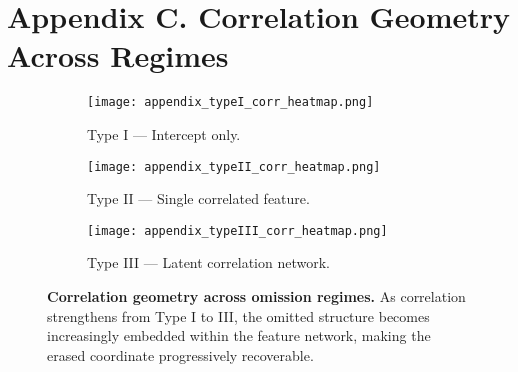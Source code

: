 \documentclass[11pt]{article}
\begin{document}
\clearpage

\section{Appendix C. Correlation Geometry Across Regimes}

\begin{figure}[H]
  \centering
  \begin{subfigure}[t]{0.32\textwidth}
    \texttt{[image: appendix\_typeI\_corr\_heatmap.png]}
    \caption{Type I — Intercept only.}
  \end{subfigure}
  \hfill
  \begin{subfigure}[t]{0.32\textwidth}
    \texttt{[image: appendix\_typeII\_corr\_heatmap.png]}
    \caption{Type II — Single correlated feature.}
  \end{subfigure}
  \hfill
  \begin{subfigure}[t]{0.32\textwidth}
    \texttt{[image: appendix\_typeIII\_corr\_heatmap.png]}
    \caption{Type III — Latent correlation network.}
  \end{subfigure}
  \caption{\textbf{Correlation geometry across omission regimes.}
  As correlation strengthens from Type I to III,
  the omitted structure becomes increasingly embedded within the feature network,
  making the erased coordinate progressively recoverable.}
  \label{fig:appendix-corr}
\end{figure}
\end{document}
